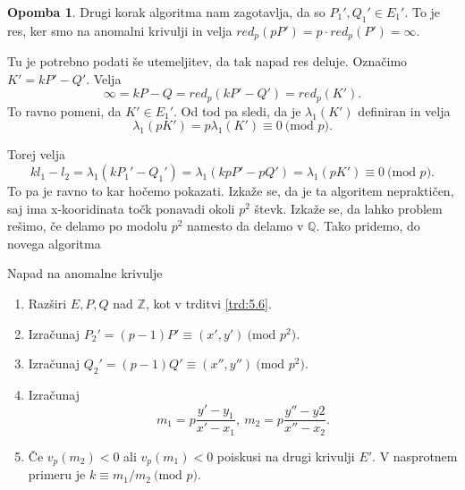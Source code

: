 \documentclass[12pt,a4paper,twoside]{article}
\theoremstyle{definition} %
\newtheorem{opomba}[definicija]{Opomba}
\theoremstyle{plain} %
\numberwithin{equation}{section}  %
\newcommand{\Z}{\mathbb Z}
\newcommand{\Q}{\mathbb Q}
\newcommand{\MOD}[1]{\ \text{(mod }{#1}\text{)}}
\begin{document}
\begin{opomba}
Drugi korak algoritma nam zagotavlja, da so $P_1',Q_1' \in E_1'$. To je res, ker smo na anomalni krivulji in velja $red_p(pP') = p\cdot red_p(P') = \infty$.
\end{opomba}

Tu je potrebno podati še utemeljitev, da tak napad res deluje. Označimo $K' = kP'-Q'$.
Velja
$$\infty = kP-Q = red_p(kP'-Q') = red_p(K').$$
To ravno pomeni, da $K' \in E_1'$. Od tod pa sledi, da je $\lambda_1(K')$ definiran in velja
$$\lambda_1(pK') = p \lambda_1(K') \equiv 0 \MOD{p}.$$

Torej velja
$$kl_1-l_2 = \lambda_1(kP_1'-Q_1') = \lambda_1(kpP'-pQ') = \lambda_1(pK') \equiv 0 \MOD{p}.$$
To pa je ravno to kar hočemo pokazati.
Izkaže se, da je ta algoritem nepraktičen, saj ima x-kooridinata točk ponavadi okoli $p^2$ števk.
Izkaže se, da lahko problem rešimo, če delamo po modolu $p^2$ namesto da delamo v $\Q$.
Tako pridemo, do novega algoritma

\begin{algorithm}[H]
\caption[ANC]{Napad na anomalne krivulje}
\label{alg:AnomalAttack}
\begin{enumerate}
\item Razširi $E,P,Q$ nad $\Z$, kot v trditvi \ref{trd:5.6}.
\item Izračunaj $P_2' = (p-1)P' \equiv (x',y') \MOD{p^2}$.
\item Izračunaj $Q_2' = (p-1)Q' \equiv(x'',y'') \MOD{p^2}$.
\item Izračunaj
$$m_1 = p\frac{y'-y_1}{x'-x_1}, \ m_2 = p\frac{y''-y2}{x''-x_2}.$$
\item Če $v_p(m_2) <0$ ali $v_p(m_1)<0$ poiskusi na drugi krivulji $E'$. V nasprotnem primeru je $k \equiv m_1/m_2 \MOD{p}$.
\end{enumerate}

\end{algorithm}
\end{document}
